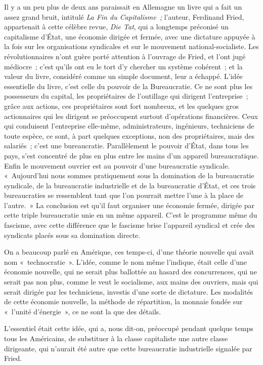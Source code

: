 \documentclass[french,twoside]{book} %
\begin{document}
\noindent Il y a un peu plus de deux ans paraissait en Allemagne un livre qui a fait un assez grand bruit, intitulé {\itshape La Fin du Capitalisme ;} l'auteur, Ferdinand Fried, appartenait à cette célèbre revue, {\itshape Die Tat}, qui a longtemps préconisé un capitalisme d'État, une économie dirigée et fermée, avec une dictature appuyée à la fois sur les organisations syndicales et sur le mouvement national-socialiste. Les révolutionnaires n'ont guère porté attention à l'ouvrage de Fried, et l'ont jugé médiocre ; c'est qu'ils ont eu le tort d'y chercher un système cohérent ; et la valeur du livre, considéré comme un simple document, leur a échappé. L'idée essentielle du livre, c'est celle du pouvoir de la Bureaucratie. Ce ne sont plus les possesseurs du capital, les propriétaires de l'outillage qui dirigent l'entreprise ; grâce aux actions, ces propriétaires sont fort nombreux, et les quelques gros actionnaires qui les dirigent se préoccupent surtout d'opérations financières. Ceux qui conduisent l'entreprise elle-même, administrateurs, ingénieurs, techniciens de toute espèce, ce sont, à part quelques exceptions, non des propriétaires, mais des salariés ; c'est une bureaucratie. Parallèlement le pouvoir d'État, dans tous les pays, s'est concentré de plus en plus entre les mains d'un appareil bureaucratique. Enfin le mouvement ouvrier est au pouvoir d'une bureaucratie syndicale. « Aujourd'hui nous sommes pratiquement sous la domination de la bureaucratie syndicale, de la bureaucratie industrielle et de la bureaucratie d'État, et ces trois bureaucraties se ressemblent tant que l'on pourrait mettre l'une à la place de l'autre. » La conclusion est qu'il faut organiser une économie fermée, dirigée par cette triple bureaucratie unie en un même appareil. C'est le programme même du fascisme, avec cette différence que le fascisme brise l'appareil syndical et crée des syndicats placés sous sa domination directe.\par
On a beaucoup parlé en Amérique, ces temps-ci, d'une théorie nouvelle qui avait nom « technocratie ». L'idée, comme le nom même l'indique, était celle d'une économie nouvelle, qui ne serait plus ballottée au hasard des concurrences, qui ne serait pas non plus, comme le veut le socialisme, aux mains des ouvriers, mais qui serait dirigée par les techniciens, investis d'une sorte de dictature. Les modalités de cette économie nouvelle, la méthode de répartition, la monnaie fondée sur « l'unité d'énergie », ce ne sont la que des détails.\par
L'essentiel était cette idée, qui a, nous dit-on, préoccupé pendant quelque temps tous les Américains, de substituer à la classe capitaliste une autre classe dirigeante, qui n'aurait été autre que cette bureaucratie industrielle signalée par Fried.\par
\end{document}
